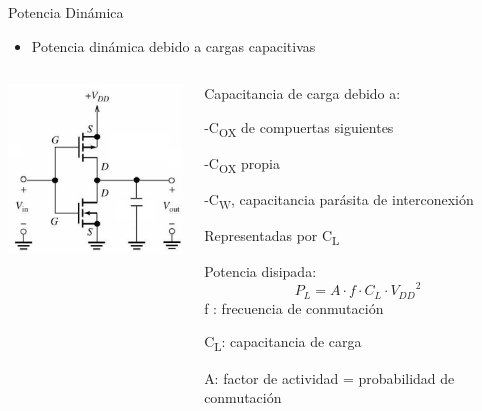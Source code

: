 \documentclass[aspectratio=169,t]{beamer}
\begin{document}
\begin{frame}{Potencia Dinámica}
\begin{itemize}
	\item Potencia dinámica debido a cargas capacitivas
\end{itemize}

\begin{columns}

	\begin{column}{0.5\textwidth}
 
		\centering
		\includegraphics[width=5cm]{pdynamic2}
  
	\end{column}
 
	\begin{column}{0.5\textwidth}
 
		Capacitancia de carga debido a:
		
		-C\textsubscript{OX} de compuertas siguientes
		
		-C\textsubscript{OX} propia
		
		-C\textsubscript{W}, capacitancia parásita de interconexión
		
		Representadas por C\textsubscript{L}
		
		\vspace{3mm}
		Potencia disipada:
		\[ P_L = A \cdot f \cdot C_L \cdot {V_{DD}}^2 \]
		f : frecuencia de conmutación
		
		C\textsubscript{L}: capacitancia de carga
		
		A: factor de actividad = probabilidad de conmutación
  
	\end{column}
 
\end{columns}

\end{frame}
\end{document}
